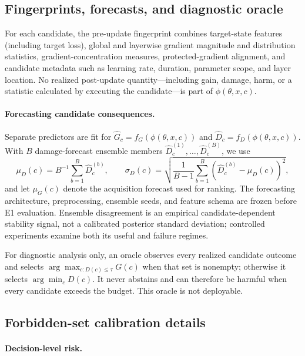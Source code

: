 \documentclass{article} %
\begin{document}
\subsection{Fingerprints, forecasts, and diagnostic oracle}
\label{sec:fingerprints}

For each candidate, the pre-update fingerprint combines target-state features
(including target loss), global and layerwise gradient magnitude and
distribution statistics, gradient-concentration measures, protected-gradient
alignment, and candidate metadata such as learning rate, duration, parameter
scope, and layer location. No realized post-update quantity---including gain,
damage, harm, or a statistic calculated by executing the candidate---is part
of $\phi(\theta,x,c)$.

\paragraph{Forecasting candidate consequences.}\label{sec:forecasting}
Separate predictors are fit for $\widehat G_c=f_G(\phi(\theta,x,c))$ and
$\widehat D_c=f_D(\phi(\theta,x,c))$. With $B$ damage-forecast ensemble
members $\widehat D_c^{(1)},\ldots,\widehat D_c^{(B)}$, we use
\[
\mu_D(c)=B^{-1}\sum_{b=1}^B\widehat D_c^{(b)},\qquad
\sigma_D(c)=\sqrt{\frac1{B-1}\sum_{b=1}^B
(\widehat D_c^{(b)}-\mu_D(c))^2},
\]
and let $\mu_G(c)$ denote the acquisition forecast used for ranking. The
forecasting architecture, preprocessing, ensemble seeds, and feature schema
are frozen before E1 evaluation. Ensemble disagreement is an empirical
candidate-dependent stability signal, not a calibrated posterior standard
deviation; controlled experiments examine both its useful and failure regimes.

For diagnostic analysis only, an oracle observes every realized candidate
outcome and selects $\arg\max_{c:D(c)\leq\tau}G(c)$ when that set is nonempty;
otherwise it selects $\arg\min_cD(c)$. It never abstains and can therefore be
harmful when every candidate exceeds the budget. This oracle is not deployable.

\subsection{Forbidden-set calibration details}
\label{sec:admissibility}

\paragraph{Decision-level risk.}\label{sec:decision_risk}
\end{document}

